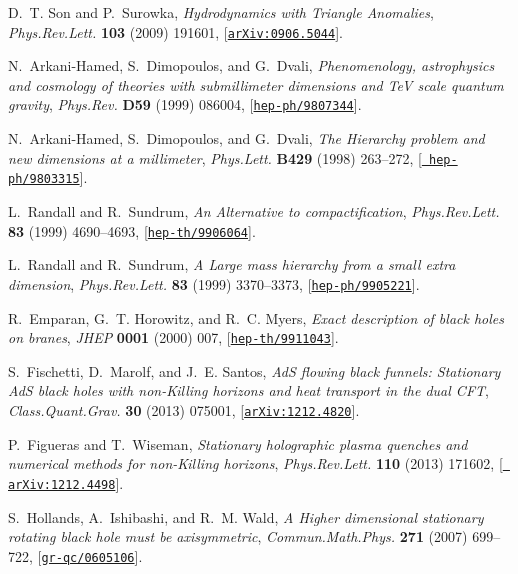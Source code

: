 \documentclass[12pt,a4paper]{article}
\begin{document}
\begin{thebibliography}{100}
D.~T. Son and P.~Surowka, {\it {Hydrodynamics with Triangle Anomalies}},  {\em
  Phys.Rev.Lett.} {\bf 103} (2009) 191601,
  [\href{http://xxx.lanl.gov/abs/0906.5044}{{\tt arXiv:0906.5044}}].

N.~Arkani-Hamed, S.~Dimopoulos, and G.~Dvali, {\it {Phenomenology, astrophysics
  and cosmology of theories with submillimeter dimensions and TeV scale quantum
  gravity}},  {\em Phys.Rev.} {\bf D59} (1999) 086004,
  [\href{http://xxx.lanl.gov/abs/hep-ph/9807344}{{\tt hep-ph/9807344}}].

N.~Arkani-Hamed, S.~Dimopoulos, and G.~Dvali, {\it {The Hierarchy problem and
  new dimensions at a millimeter}},  {\em Phys.Lett.} {\bf B429} (1998)
  263--272, [\href{http://xxx.lanl.gov/abs/hep-ph/9803315}{{\tt
  hep-ph/9803315}}].

L.~Randall and R.~Sundrum, {\it {An Alternative to compactification}},  {\em
  Phys.Rev.Lett.} {\bf 83} (1999) 4690--4693,
  [\href{http://xxx.lanl.gov/abs/hep-th/9906064}{{\tt hep-th/9906064}}].

L.~Randall and R.~Sundrum, {\it {A Large mass hierarchy from a small extra
  dimension}},  {\em Phys.Rev.Lett.} {\bf 83} (1999) 3370--3373,
  [\href{http://xxx.lanl.gov/abs/hep-ph/9905221}{{\tt hep-ph/9905221}}].

R.~Emparan, G.~T. Horowitz, and R.~C. Myers, {\it {Exact description of black
  holes on branes}},  {\em JHEP} {\bf 0001} (2000) 007,
  [\href{http://xxx.lanl.gov/abs/hep-th/9911043}{{\tt hep-th/9911043}}].

S.~Fischetti, D.~Marolf, and J.~E. Santos, {\it {AdS flowing black funnels:
  Stationary AdS black holes with non-Killing horizons and heat transport in
  the dual CFT}},  {\em Class.Quant.Grav.} {\bf 30} (2013) 075001,
  [\href{http://xxx.lanl.gov/abs/1212.4820}{{\tt arXiv:1212.4820}}].

P.~Figueras and T.~Wiseman, {\it {Stationary holographic plasma quenches and
  numerical methods for non-Killing horizons}},  {\em Phys.Rev.Lett.} {\bf 110}
  (2013) 171602, [\href{http://xxx.lanl.gov/abs/1212.4498}{{\tt
  arXiv:1212.4498}}].

S.~Hollands, A.~Ishibashi, and R.~M. Wald, {\it {A Higher dimensional
  stationary rotating black hole must be axisymmetric}},  {\em
  Commun.Math.Phys.} {\bf 271} (2007) 699--722,
  [\href{http://xxx.lanl.gov/abs/gr-qc/0605106}{{\tt gr-qc/0605106}}].


\end{thebibliography}
\end{document}
